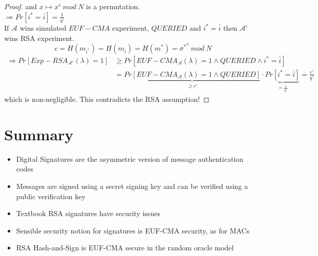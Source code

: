 \begin{proof}
            and $x \mapsto x^e \ mod\ N$ is a permutation.\\
            $\Rightarrow Pr[i^* = \bar{i}] = \frac{1}{q'}$\\
            If $\mathcal{A}$ wins simulated $EUF-CMA$ experiment, $QUERIED$ and $i^* = \bar{i}$ then $\mathcal{A}$' wins RSA experiment.
            $$c = H(m_{i^*}) = H(m_{\bar{i}}) = H(m^*) = {\sigma^*}^e \ mod\ N$$
            \begin{align*}
                \Rightarrow Pr[Exp-RSA_{\mathcal{A}'}(\lambda) = 1] &\geq Pr[EUF-CMA_{\mathcal{A}}(\lambda) = 1 \wedge QUERIED \wedge i^* = \bar{i}]\\
                    &= \underbrace{Pr[EUF-CMA_{\mathcal{A}}(\lambda) = 1 \wedge QUERIED]}_{\geq \epsilon'} \cdot \underbrace{Pr[i^* = \bar{i}]}_{= \frac{1}{q'}} 
                    = \frac{\epsilon'}{q'}
            \end{align*}
            which is non-negligible.
            This contradicts the RSA assumption!
    \end{proof}

\section{Summary}
    \begin{itemize}
        \item Digital Signatures are the asymmetric version of message authentication codes
        \item Messages are signed using a secret signing key and can be verified using a public verification key
        \item Textbook RSA signatures have security issues
        \item Sensible security notion for signatures is EUF-CMA security, as for MACs
        \item RSA Hash-and-Sign is EUF-CMA secure in the random oracle model
    \end{itemize}


